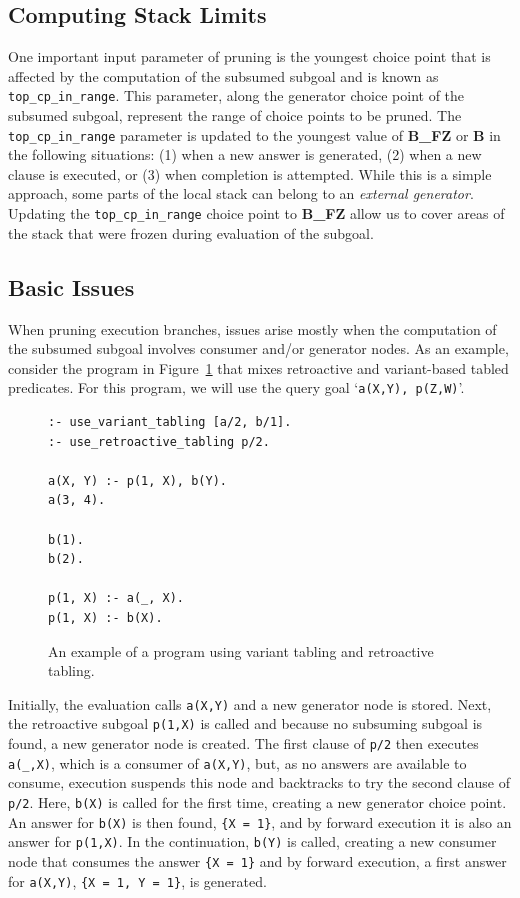 \subsection{Computing Stack Limits}

One important input parameter of pruning is the youngest choice point that is affected
by the computation of the subsumed subgoal and is known as \texttt{top\_cp\_in\_range}.
This parameter, along the generator choice point of the subsumed subgoal, represent the
range of choice points to be pruned.
The \texttt{top\_cp\_in\_range} parameter is updated to the youngest value of \textbf{B\_FZ}
or \textbf{B} in the following situations:
(1) when a new answer is generated, (2) when a new clause is executed, or (3) when completion
is attempted. While this is a simple approach, some parts of the local stack can belong to an
\textit{external generator}. Updating the \texttt{top\_cp\_in\_range} choice point to
\textbf{B\_FZ} allow us to cover areas of the stack that were frozen during evaluation of the subgoal.

\subsection{Basic Issues}

When pruning execution branches, issues arise mostly when the computation of the subsumed subgoal
involves consumer and/or generator nodes. As an example, consider the program in Figure~\ref{fig:retro_program2}
that mixes retroactive and variant-based tabled predicates. For this program, we will use the query goal
`\texttt{a(X,Y),~p(Z,W)}'.

\begin{figure}[ht]
\begin{Verbatim}
:- use_variant_tabling [a/2, b/1].
:- use_retroactive_tabling p/2.

a(X, Y) :- p(1, X), b(Y).
a(3, 4).

b(1).
b(2).

p(1, X) :- a(_, X).
p(1, X) :- b(X).
\end{Verbatim}
\caption{An example of a program using variant tabling and retroactive tabling.}
\label{fig:retro_program2}
\end{figure}

Initially, the evaluation calls \texttt{a(X,Y)} and a new generator node is stored. Next, the retroactive subgoal
\texttt{p(1,X)} is called and because no subsuming subgoal is found, a new generator node is created.
The first clause of \texttt{p/2} then executes \texttt{a(\_,X)}, which is a consumer of \texttt{a(X,Y)}, but, as
no answers are available to consume, execution suspends this node and backtracks to try the second clause
of \texttt{p/2}. Here, \texttt{b(X)} is called for the first time, creating a new generator choice point.
An answer for \texttt{b(X)} is then found, \texttt{\{X~=~1\}}, and by forward execution it is also an answer
for \texttt{p(1,X)}. In the continuation, \texttt{b(Y)} is called, creating a new consumer node that consumes the answer
\texttt{\{X~=~1\}} and by forward execution, a first answer for \texttt{a(X,Y)}, \texttt{\{X~=~1,~Y~=~1\}},
is generated.

